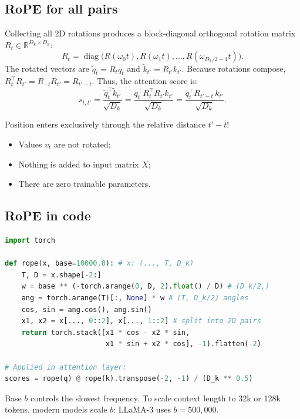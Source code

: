 \documentclass[11pt,a4paper]{article}
\newcommand{\R}{\mathbb{R}}
\newcommand{\slides}[1]{\par\nopagebreak\noindent{\normalfont\small\emph{(slides #1)}}\par\nopagebreak\vspace{2pt}}
\theoremstyle{definition}
\theoremstyle{plain}
\begin{document}
\subsection{RoPE for all pairs}\slides{54 / 84}
Collecting all 2D rotations produces a block-diagonal orthogonal rotation matrix $R_t \in \R^{D_k \times D_k}$:
\begin{equation}
R_t = \operatorname{diag}\big( R(\omega_0 t), R(\omega_1 t), \dots, R(\omega_{D_k/2 - 1} t) \big).
\end{equation}
The rotated vectors are $\tilde{q}_t = R_t q_t$ and $\tilde{k}_{t'} = R_{t'} k_{t'}$. Because rotations compose, $R_t^\top R_{t'} = R_{-t} R_{t'} = R_{t' - t}$. Thus, the attention score is:
\begin{equation}\label{eq:rope_score}
s_{t, t'} = \frac{\tilde{q}_t^\top \tilde{k}_{t'}}{\sqrt{D_k}} = \frac{q_t^\top R_t^\top R_{t'} k_{t'}}{\sqrt{D_k}} = \frac{q_t^\top R_{t' - t} \, k_{t'}}{\sqrt{D_k}}.
\end{equation}
\begin{intuition}
Position enters exclusively through the relative distance $t' - t$!
\begin{itemize}[nosep]
\item Values $v_t$ are not rotated;
\item Nothing is added to input matrix $X$;
\item There are zero trainable parameters.
\end{itemize}
\end{intuition}

\subsection{RoPE in code}\slides{55 / 84}
\begin{lstlisting}[language=Python]
import torch

def rope(x, base=10000.0): # x: (..., T, D_k)
    T, D = x.shape[-2:]
    w = base ** (-torch.arange(0, D, 2).float() / D) # (D_k/2,)
    ang = torch.arange(T)[:, None] * w # (T, D_k/2) angles
    cos, sin = ang.cos(), ang.sin()
    x1, x2 = x[..., 0::2], x[..., 1::2] # split into 2D pairs
    return torch.stack([x1 * cos - x2 * sin,
                        x1 * sin + x2 * cos], -1).flatten(-2)

# Applied in attention layer:
scores = rope(q) @ rope(k).transpose(-2, -1) / (D_k ** 0.5)
\end{lstlisting}
Base $b$ controls the slowest frequency. To scale context length to 32k or 128k tokens, modern models scale $b$: LLaMA-3 uses $b = 500{,}000$.
\end{document}
